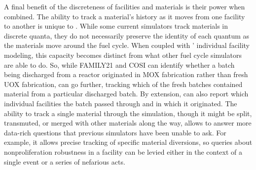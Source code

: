 A final benefit of the discreteness of facilities and materials is their power
when combined. The ability to track a material's history as it moves from one
facility to another is unique to \Cyclus. While some current simulators track
materials in discrete quanta, they do not necessarily preserve the identity of each quantum as the
materials move around the fuel cycle. When coupled with \Cyclus' individual
facility modeling, this capacity becomes distinct from what other fuel cycle
simulators are able to do. So, while FAMILY21 and \gls{COSI} can identify
whether a batch being discharged from a reactor originated in \gls{MOX}
fabrication rather than fresh \gls{UOX} fabrication, \Cyclus can go further,
tracking which of the fresh batches contained material from a particular
discharged batch. By extension, \Cyclus can also report which individual
facilities the batch passed through and in which it originated. 
The ability to track a single material through the simulation, 
though it might be split, transmuted, or merged with other materials along the 
way, allows \Cyclus to answer more data-rich questions that previous simulators
have been unable to ask. For example, it allows precise tracking of 
specific material diversions, so queries about nonproliferation 
robustness in a facility can be levied either in the context of a single event or 
a series of nefarious acts.
